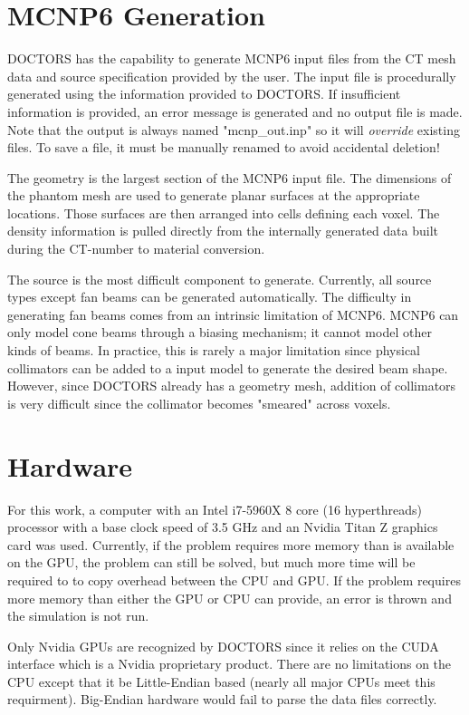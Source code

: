 \section{MCNP6 Generation}\label{sec:mcnpgen}
DOCTORS has the capability to generate MCNP6 input files from the CT mesh data and source specification provided by the user. The input file is procedurally generated using the information provided to DOCTORS. If insufficient information is provided, an error message is generated and no output file is made. Note that the output is always named "mcnp\_out.inp" so it will \textit{override} existing files. To save a file, it must be manually renamed to avoid accidental deletion!

The geometry is the largest section of the MCNP6 input file. The dimensions of the phantom mesh are used to generate planar surfaces at the appropriate locations. Those surfaces are then arranged into cells defining each voxel. The density information is pulled directly from the internally generated data built during the CT-number to material conversion.

The source is the most difficult component to generate. Currently, all source types except fan beams can be generated automatically. The difficulty in generating fan beams comes from an intrinsic limitation of MCNP6. MCNP6 can only model cone beams through a biasing mechanism; it cannot model other kinds of beams. In practice, this is rarely a major limitation since physical collimators can be added to a input model to generate the desired beam shape. However, since DOCTORS already has a geometry mesh, addition of collimators is very difficult since the collimator becomes "smeared" across voxels.

\section{Hardware}\label{sec:hardware}
For this work, a computer with an Intel i7-5960X 8 core (16 hyperthreads) processor with a base clock speed of 3.5 GHz and an Nvidia Titan Z graphics card was used. Currently, if the problem requires more memory than is available on the GPU, the problem can still be solved, but much more time will be required to to copy overhead between the CPU and GPU. If the problem requires more memory than either the GPU or CPU can provide, an error is thrown and the simulation is not run.

Only Nvidia GPUs are recognized by DOCTORS since it relies on the CUDA interface which is a Nvidia proprietary product. There are no limitations on the CPU except that it be Little-Endian based (nearly all major CPUs meet this requirment). Big-Endian hardware would fail to parse the data files correctly.

\endinput
